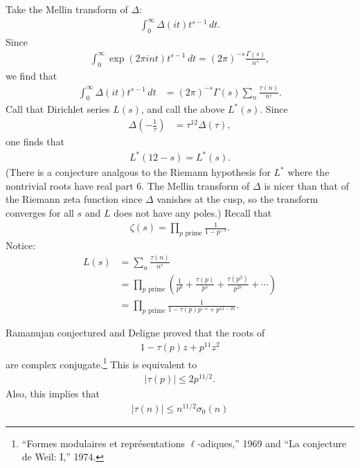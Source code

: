 \documentclass[11pt, oneside,margin=1in]{article}
\begin{document}
Take the Mellin transform of $\Delta$:
\begin{align*}
	\int_{0}^{\infty} \Delta(it) t^{s-1} \, dt. 
\end{align*}
Since
\begin{align*}
	\int_{0}^{\infty} \exp({2\pi i n t})t^{s-1}  \, dt = (2\pi)^{-s}  \frac{\Gamma(s)}{n^s}, 
\end{align*}
we find that
\begin{align*}
	\int_{0}^{\infty} \Delta(it) t^{s-1} \, dt	&=(2\pi)^{-s} \Gamma (s)  \sum_{n}^{} \frac{\tau(n)}{n^s}.	
\end{align*}
Call that Dirichlet series $L(s)$, and call the above $L^*(s)$. Since
\begin{align*}
	\Delta \left( -\frac{1}{\tau} \right) &= \tau^{12}\Delta(\tau),
\end{align*}
one finds that
\begin{align*}
	L^*(12-s) = L^* (s).
\end{align*}
(There is a conjecture analgous to the Riemann hypothesis for $L^*$ where the nontrivial roots have real part $6$. The Mellin transform of $\Delta$ is nicer than that of the Riemann zeta function since $\Delta$ vanishes at the cusp, so the transform converges for all $s$ and $L$ does not have any poles.) Recall that
 \begin{align*}
	\zeta(s) = \prod_{p \textrm{ prime}}  \frac{1}{1-p^{-s}}.
\end{align*}
Notice:
\begin{align*}
	L(s) &=  \sum_{n}^{} \frac{\tau(n)}{n^s}\\
	     &= \prod_{p\textrm { prime}} \left( \frac{1}{p^0} + \frac{\tau(p)}{p^s}  + \frac{\tau(p^2)}{p^{2s}} + \cdots \right)\\
	     &= \prod_{p\textrm{ prime}} \frac{1}{1-\tau(p)p^{-s} + p^{11-2s}}.
\end{align*}

Ramanujan conjectured and Deligne proved that the roots of 
\begin{align*}
	1 - \tau(p) z + p^{11} z^2
\end{align*}
are complex conjugate.\footnote{``Formes modulaires et repr\'esentations $\ell$-adiques,'' 1969 and ``La conjecture de Weil: I,'' 1974.} This is equivalent to
\begin{align*}
	\left\lvert \tau(p) \right\rvert \le 2p^{11/2}.
\end{align*}
Also, this implies that
\begin{align*}
	\left\lvert \tau(n) \right\rvert \le n^{11/2}\sigma_0 (n)
\end{align*}
\end{document}
